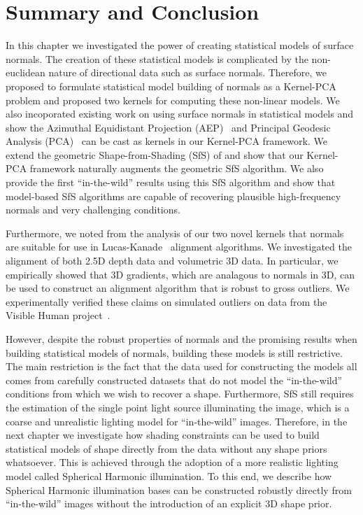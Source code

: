 \section{Summary and Conclusion}\label{sec:singl_img_summary}
In this chapter we investigated the power of creating statistical models
of surface normals. The creation of these statistical models is complicated
by the non-euclidean nature of directional data such as surface normals.
Therefore, we proposed to formulate statistical model building of normals
as a Kernel-PCA problem and proposed two kernels for computing these non-linear
models. We also incoporated existing work on using surface normals in 
statistical models and show the 
Azimuthal Equidistant Projection (AEP)~\cite{smith2006recovering} and
Principal Geodesic Analysis (PCA)~\cite{smith2008facial} can be cast as 
kernels in our Kernel-PCA framework. We extend the geometric 
Shape-from-Shading (SfS) of \citet{smith2006recovering} and show that our 
Kernel-PCA framework naturally augments the geometric SfS algorithm. We also
provide the first ``in-the-wild'' results using this SfS algorithm and show
that model-based SfS algorithms are capable of recovering plausible high-frequency
normals and very challenging conditions.

Furthermore, we noted from the analysis of our two novel kernels that normals
are suitable for use in Lucas-Kanade~\cite{lucas1981iterative} alignment
algorithms. We investigated the alignment of both 2.5D depth data and volumetric
3D data. In particular, we empirically showed that 3D gradients, which are
analagous to normals in 3D, can be used to construct an alignment algorithm
that is robust to gross outliers. We experimentally verified these claims
on simulated outliers on data from the 
Visible Human project~\cite{spitzer1996visiblehuman}.

However, despite the robust properties of normals and the promising results
when building statistical models of normals, building these models is still
restrictive. The main restriction is the fact that the data used
for constructing the models all comes from carefully constructed datasets
that do not model the ``in-the-wild'' conditions from which we wish to recover 
a shape. Furthermore, SfS still requires the estimation of the single point light 
source illuminating the image, which is a coarse and unrealistic lighting
model for ``in-the-wild'' images. Therefore, in the next chapter we investigate
how shading constraints can be used to build statistical models of shape
directly from the data without any shape priors whatsoever. This is achieved
through the adoption of a more realistic lighting model called Spherical
Harmonic illumination. To this end, we describe how Spherical Harmonic illumination
bases can be constructed robustly directly from ``in-the-wild'' images
without the introduction of an explicit 3D shape prior.